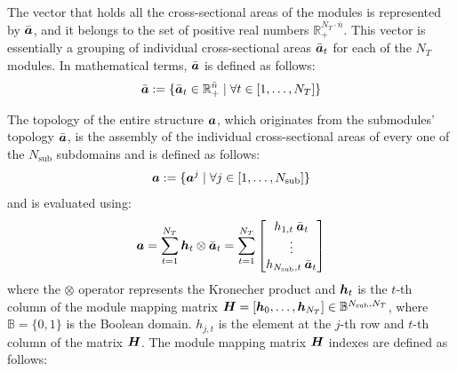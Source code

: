 The vector that holds all the cross-sectional areas of the modules is represented by $\bar{\bm{a}}$, and it belongs to the set of positive real numbers $\mathbb{R}_+^{N_T \cdot \bar{n}}$. This vector is essentially a grouping of individual cross-sectional areas $\bar{\bm{a}}_t$ for each of the $N_T$ modules. In mathematical terms, $\bar{\bm{a}}$ is defined as follows:
\begin{equation}
    \bar{\bm{a}} :=  \{ \bar{\bm{a}}_t \in \mathbb{R}_+^{\bar{n}} \;|\; \forall t \in [1,\dots,N_T]\}
\end{equation}

The topology of the entire structure $\bm{a}$, which originates from the submodules' topology $\bar{\bm{a}}$, is the assembly of the individual cross-sectional areas of every one of the $N_{\text{sub}}$ subdomains and is defined as follows:
\begin{equation}
    \bm{a} :=  \{\bm{a}^j \;|\; \forall j \in [1,\dots,N_{\text{sub}}]\}
\end{equation}
and is evaluated using:
\begin{equation}
    \bm{a} = \sum_{t=1}^{N_T} \bm{h}_t\otimes\bar{\bm{a}}_t = \sum_{t=1}^{N_T} \begin{bmatrix}
        h_{1,t} \: \bar{\bm{a}}_t \\
        \vdots\\
        h_{N_{\text{sub}},t} \: \bar{\bm{a}}_t 
        \end{bmatrix}
        \label{eq:05_VL}
\end{equation}
where the $\otimes$ operator represents the Kronecher product and $\bm{h}_{t}$ is the $t$-th column of the module mapping matrix $\bm{H} = [\bm{h}_0,\dots,\bm{h}_{N_T}] \in \mathbb{B}^{N_{\text{sub}},N_T}$, where $\mathbb{B}=\lbrace 0,1 \rbrace$ is the Boolean domain. $h_{j,t}$ is the element at the $j$-th row and $t$-th column of the matrix $\bm{H}$. The module mapping matrix $\bm{H}$ indexes are defined as follows:
